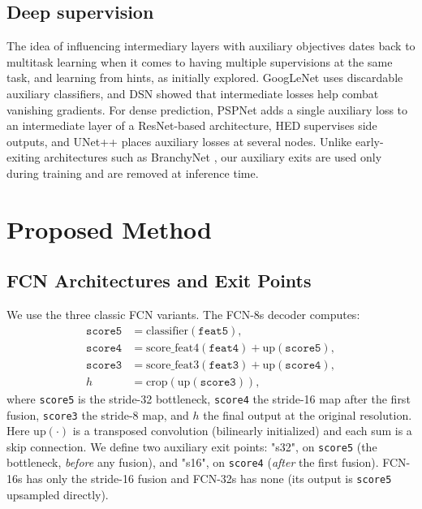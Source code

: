\documentclass{article}
\begin{document}
    \subsection{Deep supervision}
    The idea of influencing intermediary layers with auxiliary objectives dates back to multitask learning \cite{ref_multitask} when it comes to having multiple supervisions at the same task, and learning from hints, as \citet{ref_hints} initially explored. GoogLeNet \cite{ref_googlenet} uses discardable auxiliary classifiers, and DSN \cite{ref_dsn} showed that intermediate losses help combat vanishing gradients. For dense prediction, PSPNet \cite{ref_pspnet} adds a single auxiliary loss to an intermediate layer of a ResNet-based architecture, HED \cite{ref_hed} supervises side outputs, and UNet++ \cite{ref_unetpp} places auxiliary losses at several nodes. Unlike early-exiting architectures such as BranchyNet \cite{ref_branchynet}, our auxiliary exits are used only during training and are removed at inference time.



\section{Proposed Method}

    \subsection{FCN Architectures and Exit Points}

    We use the three classic FCN variants. The FCN-8s
    decoder computes:
    \begin{align}
    \texttt{score5} &= \mathrm{classifier}(\texttt{feat5}), \\
    \texttt{score4} &= \mathrm{score\_feat4}(\texttt{feat4}) + \mathrm{up}(\texttt{score5}), \\
    \texttt{score3} &= \mathrm{score\_feat3}(\texttt{feat3}) + \mathrm{up}(\texttt{score4}), \\
    h &= \mathrm{crop}(\mathrm{up}(\texttt{score3})),
    \end{align}
    where \texttt{score5} is the stride-32 bottleneck, \texttt{score4} the
    stride-16 map after the first fusion, \texttt{score3} the stride-8 map, and
    $h$ the final output at the original resolution. Here $\mathrm{up}(\cdot)$ is
    a transposed convolution (bilinearly
    initialized) and each sum is a skip connection. We define two auxiliary exit
    points: "s32", on \texttt{score5} (the bottleneck, \emph{before} any
    fusion), and "s16", on \texttt{score4} (\emph{after} the first fusion).
    FCN-16s has only the stride-16 fusion and FCN-32s has none (its output is
    \texttt{score5} upsampled directly).
\end{document}
